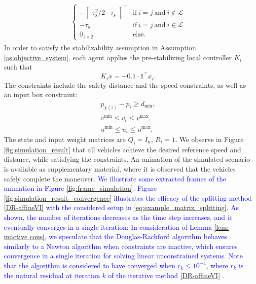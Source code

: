 \documentclass[letterpaper, 10 pt, conference]{ieeeconf}  %
\newcommand{\edit}[1]{\textcolor{blue}{#1}}
\newcommand{\mc}{\mathcal}
\begin{document}
{\begin{align}
\begin{split}
\begin{cases}
        -\begin{bmatrix}
            \tau_\text{s}^2/2 & \tau_\text{s} 
        \end{bmatrix}^\top &\text{if}~ i=j ~\text{and}~ i\notin\mc L \\
        -\tau_\text{s} &\text{if}~ i=j ~\text{and}~ i\in\mc L \\
        0_{1\times 2}  & \text{else}.
        \end{cases}
    \end{split}
\end{align}
In order to satisfy the stabilizability assumption in Assumption \ref{as:objective_system}, each agent applies the pre-stabilizing local controller $K_i$ such that
\begin{equation*}
    K_ix =-0.1\cdot \mathds{1}^\top x_i.
\end{equation*}
The constraints include the safety distance and the speed constraints, as well as an input box constraint:
\begin{align*}
    p_{\chi(i)} - p_i \geq d_{\text{min}},\\
    v^{\text{min}} \leq v_i \leq v^{\text{max}},\\
    u^{\text{min}} \leq u_i \leq u^{\text{max}}. 
\end{align*}
The state and input weight matrices are $Q_i=I_n$, $R_i = 1$. We observe in Figure \ref{fig:simulation_result} that all vehicles achieve the desired reference speed and distance, while satisfying the constraints. An animation of the simulated scenario is available as supplementary material, where it is observed that the vehicles safely complete the maneuver. \edit{We illustrate some extracted frames of the animation in Figure \ref{fig:frame_simulation}.} \edit{Figure \ref{fig:simulation_result_convergence} illustrates the efficacy of the splitting method \eqref{DR-affineVI} with the considered setup in \eqref{eq:example_matrix_splitting}. As shown, the number of iterations decreases as the time step increases, and it eventually converges in a single iteration: In consideration of Lemma \ref{lem: inactive cons}, we speculate that the Douglas-Rachford algorithm behaves similarly to a Newton algorithm when constraints are inactive, which ensures convergence in a single iteration for solving linear unconstrained systems. Note that the algorithm is considered to have converged when \( r_k \leq 10^{-4} \), where \( r_k \) is the natural residual at iteration \( k \) of the iterative method \eqref{DR-affineVI} \cite[\S 6.2.1]{facchinei2003finite}.}

}
\end{document}

